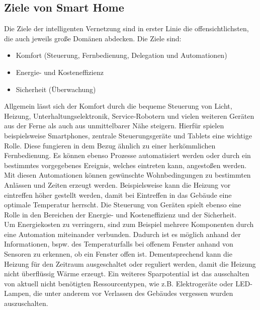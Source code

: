     \subsection{Ziele von Smart Home} %
    \label{subsec:ziele_sh}
        Die Ziele der intelligenten Vernetzung sind in erster Linie die offensichtlichsten, die auch jeweils 
        große Domänen abdecken. Die Ziele sind:
        \begin{itemize}
            \item Komfort (Steuerung, Fernbedienung, Delegation und Automationen)
            \item Energie- und Kosteneffizienz
            \item Sicherheit (Überwachung)
        \end{itemize}
        Allgemein lässt sich der Komfort durch die bequeme Steuerung von Licht, Heizung, Unterhaltungselektronik, 
        Service-Robotern und vielen weiteren Geräten aus der Ferne als auch aus unmittelbarer Nähe steigern. 
        Hierfür spielen beispielsweise Smartphones, zentrale Steuerungsgeräte und Tablets eine wichtige Rolle. 
        Diese fungieren in dem Bezug ähnlich zu einer herkömmlichen Fernbedienung. Es können ebenso Prozesse 
        automatisiert werden oder durch ein bestimmtes vorgegebenes Ereignis, welches 
        eintreten kann, angestoßen werden. Mit diesen Automationen können gewünschte Wohnbedingungen zu 
        bestimmten Anlässen und Zeiten erzeugt werden. Beispielsweise kann die Heizung vor eintreffen höher 
        gestellt werden, damit bei Eintreffen in das Gebäude eine optimale Temperatur herrscht. Die Steuerung von 
        Geräten spielt ebenso eine Rolle in den Bereichen der Energie- und Kosteneffizienz und der Sicherheit. 
        \\
        \linebreak
        Um Energiekosten zu verringern, sind zum Beispiel mehrere Komponenten durch eine Automation miteinander 
        verbunden. Dadurch ist es möglich anhand der Informationen, bspw. des Temperaturfalls bei offenem Fenster 
        anhand von Sensoren zu erkennen, ob ein Fenster offen ist. Dementsprechend kann die Heizung für den Zeitraum 
        ausgeschaltet oder reguliert werden, damit die Heizung nicht überflüssig Wärme erzeugt. Ein weiteres 
        Sparpotential ist das ausschalten von aktuell nicht benötigten Ressourcentypen, wie z.B. Elektrogeräte 
        oder LED-Lampen, die unter anderem vor Verlassen des Gebäudes vergessen wurden auszuschalten.
